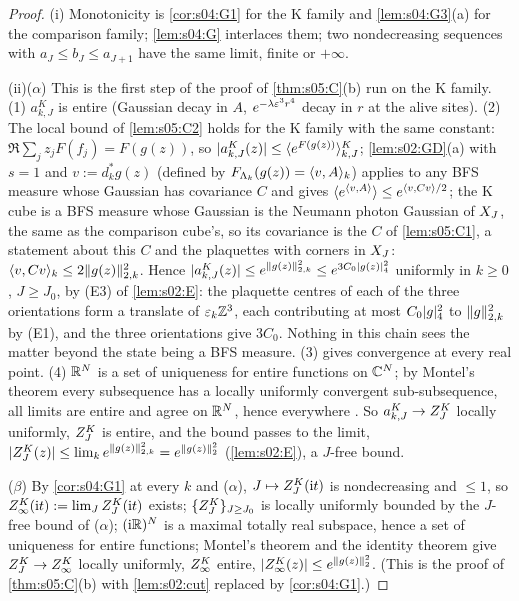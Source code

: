 \begin{proof}
(i) Monotonicity is \cref{cor:s04:G1} for the K family and \cref{lem:s04:G3}(a) for the comparison family; \cref{lem:s04:G} interlaces them; two nondecreasing sequences with $a_J\le b_J\le a_{J+1}$ have the same limit, finite or $+\infty$.

(ii)($\alpha$) This is the first step of the proof of \cref{thm:s05:C}(b) run on the K family. (1) $a^K_{k,J}$ is entire (Gaussian decay in $A$, $e^{-\lambda\varepsilon^3r^4}$ decay in $r$ at the alive sites). (2) The local bound of \cref{lem:s05:C2} holds for the K family with the same constant: $\Re\sum_jz_jF(f_j)=F(g(z))$, so $|a^K_{k,J}(z)|\le\langle e^{F(g(z))}\rangle^{K}_{k,J}$; \cref{lem:s02:GD}(a) with $s=1$ and $v:=d^*_kg(z)$ (defined by $F_{\Lambda_k}(g(z))=\langle v,A\rangle_k$) applies to any BFS measure whose Gaussian has covariance $C$ and gives $\langle e^{\langle v,A\rangle}\rangle\le e^{\langle v,Cv\rangle/2}$; the K cube is a BFS measure whose Gaussian is the Neumann photon Gaussian of $X_J$, the same as the comparison cube's, so its covariance is the $C$ of \cref{lem:s05:C1}, a statement about this $C$ and the plaquettes with corners in $X_J$: $\langle v,Cv\rangle_k\le2\lVert g(z)\rVert_{2,k}^2$. Hence $|a^K_{k,J}(z)|\le e^{\lVert g(z)\rVert_{2,k}^2}\le e^{3C_0\lvert g(z)\rvert_{4}^2}$ uniformly in $k\ge0$, $J\ge J_0$, by (E3) of \cref{lem:s02:E}: the plaquette centres of each of the three orientations form a translate of $\varepsilon_k\mathbb Z^3$, each contributing at most $C_0\lvert g\rvert_{4}^2$ to $\lVert g\rVert_{2,k}^2$ by (E1), and the three orientations give $3C_0$. Nothing in this chain sees the matter beyond the state being a BFS measure. (3)  gives convergence at every real point. (4) $\mathbb R^N$ is a set of uniqueness for entire functions on $\mathbb C^N$; by Montel's theorem every subsequence has a locally uniformly convergent sub-subsequence, all limits are entire and agree on $\mathbb R^N$, hence everywhere \cite{Hor90}. So $a^K_{k,J}\to Z^{K}_{J}$ locally uniformly, $Z^{K}_{J}$ is entire, and the bound passes to the limit, $|Z^{K}_{J}(z)|\le\lim_ke^{\lVert g(z)\rVert_{2,k}^2}=e^{\lVert g(z)\rVert_2^2}$ (\cref{lem:s02:E}), a $J$-free bound.

($\beta$) By \cref{cor:s04:G1} at every $k$ and ($\alpha$), $J\mapsto Z^{K}_{J}(\mathrm it)$ is nondecreasing and $\le1$, so $Z^{K}_{\infty}(\mathrm it):=\lim_JZ^{K}_{J}(\mathrm it)$ exists; $\{Z^{K}_{J}\}_{J\ge J_0}$ is locally uniformly bounded by the $J$-free bound of ($\alpha$); $(\mathrm i\mathbb R)^N$ is a maximal totally real subspace, hence a set of uniqueness for entire functions; Montel's theorem and the identity theorem give $Z^{K}_{J}\to Z^{K}_{\infty}$ locally uniformly, $Z^{K}_{\infty}$ entire, $|Z^{K}_{\infty}(z)|\le e^{\lVert g(z)\rVert_2^2}$. (This is the proof of \cref{thm:s05:C}(b) with \cref{lem:s02:cut} replaced by \cref{cor:s04:G1}.)


\end{proof}
